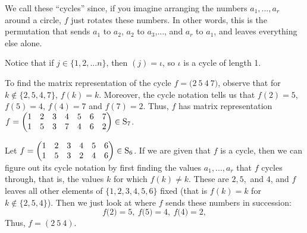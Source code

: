 \documentclass[11pt,dvipsnames]{book}
\numberwithin{figure}{section} %
\numberwithin{table}{section} %
\begin{document}
We call these ``cycles'' since, if you imagine arranging the numbers $a_{1},...,a_{r}$ around a circle, $f$ just rotates these numbers. In other words, this is the permutation that sends $a_{1}$ to $a_{2}$, $a_{2}$ to $a_{3}$,..., and $a_{r}$ to $a_{1}$, and leaves everything else alone. 

Notice that if $j\in \{1,2,...n\}$, then $(j)=\iota$, so $\iota$ is a cycle of length 1.


 \begin{example}
To find the matrix representation of the cycle $f=\big(2\ 5\ 4\ 7\big)$, observe that for $k\not\in \{2,5,4,7\}$, $f(k)=k$. Moreover, the cycle notation tells us that $f(2)=5$, $f(5)=4$, $f(4)=7$ and $f(7)=2$. Thus, $f$ has matrix representation $f=\left(\begin{matrix} %
1 & 2 & 3 & 4 & 5 & 6 & 7 \cr%
1 & 5 & 3 & 7 & 4 & 6 & 2 \cr%
\end{matrix}\right)\in\mathrm{S}_{7}$. 

\end{example}




 \begin{example}
Let $f=\left(\begin{matrix} %
1 & 2 & 3 & 4 & 5 & 6\cr%
1 & 5 & 3 & 2 & 4 & 6 \cr%
\end{matrix}\right)\in\mathrm{S}_6$.  If we are given that $f$ is a cycle, then we can figure out its cycle notation by first finding the values $a_{1},...,a_{r}$ that $f$ cycles through, that is, the values $k$ for which $f(k)\neq k$. These are $2,5,$ and $4$, and $f$ leaves all other elements of $\{1,2,3,4,5,6\}$
fixed (that is $f(k)=k$ for $k\not\in \{2,5,4\}$). Then we just look at where $f$ sends these numbers in succession:
$$
f\big(2\big)=5,\  f\big(5\big)=4,\  f\big(4\big)=2,
$$
Thus, $f=(2\ 5\ 4)$.
\end{example}
\end{document}
